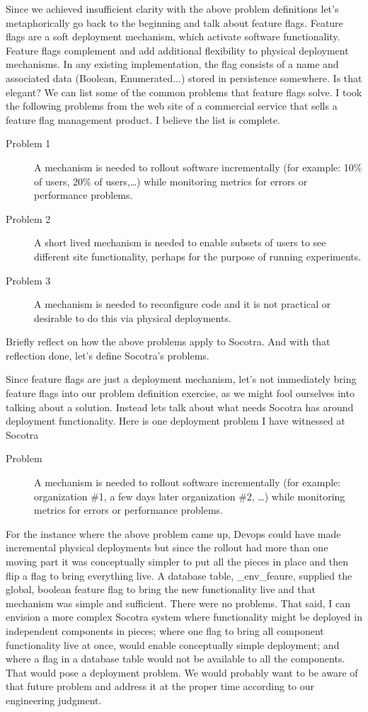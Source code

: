 Since we achieved insufficient clarity with the above problem definitions let's metaphorically go back to the beginning and talk about feature
flags. Feature flags are a soft deployment mechanism, which activate software functionality. Feature flags complement and add additional
flexibility to physical deployment mechanisms. In any existing implementation, the flag consists of a name and associated data (Boolean,
Enumerated...) stored in persistence somewhere. Is that elegant? We can list some of the common problems that feature flags solve. I took
the following problems from the web site of a commercial service that sells a feature flag management product. I believe the list is complete.

\begin{description}
  \item[Problem 1] A mechanism is needed to rollout software incrementally (for example: 10\% of users, 20\% of users,\dots) while monitoring
  metrics for errors or performance problems.
  \item[Problem 2] A short lived mechanism is needed to enable subsets of users to see different site functionality, perhaps for the purpose of
  running experiments.
  \item[Problem 3] A mechanism is needed to reconfigure code and it is not practical or desirable to do this via physical deployments.
\end{description}
Briefly reflect on how the above problems apply to Socotra. And with that reflection done, let's define Socotra's
problems.

Since feature flags are just a deployment mechanism, let's not immediately bring feature flags into our problem definition exercise, as we might
fool ourselves into
talking about a solution. Instead lets talk about what needs Socotra has around deployment functionality. Here is one deployment problem I
have witnessed at Socotra
\begin{description}
  \item[Problem] A mechanism is needed to rollout software incrementally (for example: organization \#1, a few days later organization \#2, \dots) while monitoring
  metrics for errors or performance problems.
\end{description}
For the instance where the above problem came up, Devops could have made incremental physical deployments but since the rollout had
more than one moving part it was conceptually simpler to put all the pieces in place and then flip a flag to bring everything live.
A database table, \_env\_feaure, supplied the global, boolean feature flag to bring the new functionality live and that mechanism was
simple and sufficient. There were no problems. That said, I can envision a more complex Socotra system where functionality might be
deployed in independent components in pieces; where one flag to bring all component functionality live at once, would enable conceptually simple deployment;
and where a flag in a database table would not be available to all the components. That would pose a deployment problem. We would probably
want to be aware of that future problem and address it at the proper time according to our engineering judgment.

